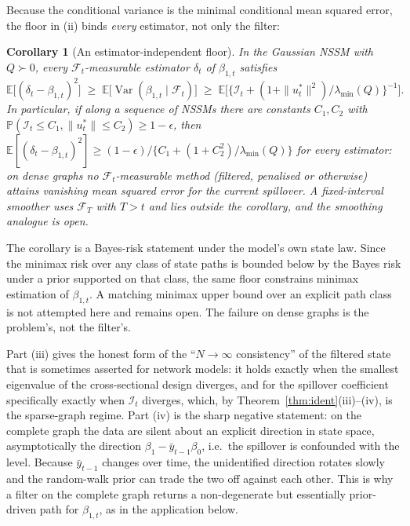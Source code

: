 \documentclass[12pt]{article}
\theoremstyle{plain}
\newtheorem{corollary}{Corollary}
\theoremstyle{definition}
\theoremstyle{remark}
\newcommand{\E}{\mathbb{E}}
\newcommand{\Prob}{\mathbb{P}}
\newcommand{\Var}{\operatorname{Var}}
\newcommand{\calF}{\mathcal{F}}
\newcommand{\calI}{\mathcal{I}}
\begin{document}
Because the conditional variance is the minimal conditional mean squared error, the floor in (ii) binds \emph{every} estimator, not only the filter:

\begin{corollary}[An estimator-independent floor]\label{cor:floor}
In the Gaussian NSSM with $Q\succ0$, every $\calF_t$-measurable estimator $\delta_t$ of $\beta_{1,t}$ satisfies
\[
\E\big[(\delta_t-\beta_{1,t})^2\big]\;\ge\;\E\big[\Var(\beta_{1,t}\mid\calF_t)\big]\;\ge\;\E\Big[\big\{\calI_t+(1+\|u_t^*\|^2)/\lambda_{\min}(Q)\big\}^{-1}\Big].
\]
In particular, if along a sequence of NSSMs there are constants $C_1,C_2$ with $\Prob(\calI_t\le C_1,\|u_t^*\|\le C_2)\ge1-\epsilon$, then $\E[(\delta_t-\beta_{1,t})^2]\ge(1-\epsilon)/\{C_1+(1+C_2^2)/\lambda_{\min}(Q)\}$ for every estimator: on dense graphs no $\calF_t$-measurable method (filtered, penalised or otherwise) attains vanishing mean squared error for the current spillover. A fixed-interval smoother uses $\calF_T$ with $T>t$ and lies outside the corollary, and the smoothing analogue is open.
\end{corollary}

The corollary is a Bayes-risk statement under the model's own state law. Since the minimax risk over any class of state paths is bounded below by the Bayes risk under a prior supported on that class, the same floor constrains minimax estimation of $\beta_{1,t}$. A matching minimax upper bound over an explicit path class is not attempted here and remains open. The failure on dense graphs is the problem's, not the filter's.

Part (iii) gives the honest form of the ``$N\to\infty$ consistency'' of the filtered state that is sometimes asserted for network models: it holds exactly when the smallest eigenvalue of the cross-sectional design diverges, and for the spillover coefficient specifically exactly when $\calI_t$ diverges, which, by Theorem~\ref{thm:ident}(iii)--(iv), is the sparse-graph regime. Part (iv) is the sharp negative statement: on the complete graph the data are silent about an explicit direction in state space, asymptotically the direction $\beta_1-\bar y_{t-1}\beta_0$, i.e.\ the spillover is confounded with the level. Because $\bar y_{t-1}$ changes over time, the unidentified direction rotates slowly and the random-walk prior can trade the two off against each other. This is why a filter on the complete graph returns a non-degenerate but essentially prior-driven path for $\beta_{1,t}$, as in the application below.
\end{document}
